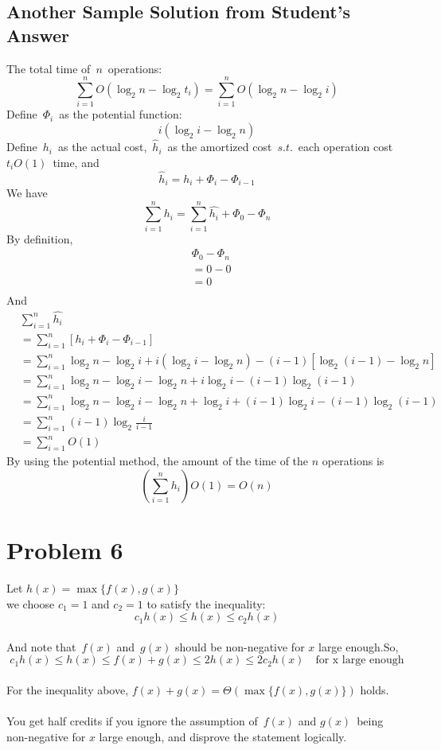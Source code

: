 \documentclass[a4paper]{article}
\begin{document}
\subsection{Another Sample Solution from Student's Answer}
The total time of\ $n$\ operations:\\
$$\sum\limits_{i=1}^{n}O(\log_2n-\log_2t_i) = \sum\limits_{i=1}^{n}O(\log_2n-\log_2i)$$
Define\ $\Phi_i$\ as the potential function:\\
$$i(\log_2i-\log_2n)$$
Define\ $h_i$\ as the actual cost,\ $\hat{h}_i$\ as the amortized cost\ $s.t.$\ each operation cost\ $t_iO(1)$\ time, and\\
$$\hat{h}_i=h_i+\Phi_i-\Phi_{i-1}$$
We have
$$\sum\limits_{i=1}^{n}h_i=\sum\limits_{i=1}^{n}\hat{h_i}+\Phi_0-\Phi_n$$
By definition,\\
\begin{align*}
&\Phi_0-\Phi_n\\
&=0-0\\
&=0\\
\end{align*}  
And\\
\begin{align*}
&\sum\limits_{i=1}^{n}\hat{h_i}\\
&=\sum\limits_{i=1}^{n}\left[h_i+\Phi_i-\Phi_{i-1}\right]\\
&=\sum\limits_{i=1}^{n}\log_2n-\log_2i+i(\log_2i-\log_2n)-(i-1)[\log_2(i-1)-\log_2n]\\
&=\sum\limits_{i=1}^{n}\log_2n-\log_2i-\log_2n+i\log_2i-(i-1)\log_2(i-1)\\
&=\sum\limits_{i=1}^{n}\log_2n-\log_2i-\log_2n+\log_2i+(i-1)\log_2i-(i-1)\log_2(i-1)\\
&=\sum\limits_{i=1}^{n}(i-1)\log_2{\frac{i}{i-1}}\\
&=\sum\limits_{i=1}^{n}O(1)
\end{align*}
By using the potential method, the amount of the time of the $n$ operations is\\
$$\left(\sum\limits_{i=1}^{n}h_i\right)O(1)=O(n)$$
\section{Problem 6}
Let $h(x)=\max\{f(x),g(x)\}$\\
we choose $c_1=1$ and $c_2=1$ to satisfy the inequality:\\
$$c_1h(x)\leq h(x)\leq c_2h(x)$$\\
And note that\ $f(x)$ and\ $g(x)$ should be non-negative for $x$ large enough.So,\\
$$c_1h(x)\leq h(x)\leq f(x)+g(x)\leq 2h(x)\leq 2c_2h(x)\quad\text{for x large enough}$$\\
For the inequality above, $f(x)+g(x)=\Theta(\max\{f(x),g(x)\})$ holds.\\\\
You get half credits if you ignore the assumption of\ $f(x)$ and $g(x)$\ being non-negative for $x$ large enough, and disprove the statement logically.  
\end{document}
